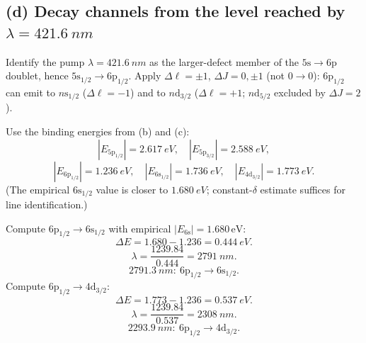\documentclass[11pt]{article}
\begin{document}
\subsection*{(d) Decay channels from the level reached by $\lambda=\SI{421.6}{nm}$}

Identify the pump $\lambda=\SI{421.6}{nm}$ as the larger-defect member of the $5\mathrm{s}\to 6\mathrm{p}$ doublet, hence $5\mathrm{s}_{1/2}\to 6\mathrm{p}_{1/2}$. Apply $\Delta\ell=\pm 1$, $\Delta J=0,\pm 1$ (not $0\to 0$): $6\mathrm{p}_{1/2}$ can emit to $n\mathrm{s}_{1/2}$ ($\Delta\ell=-1$) and to $n\mathrm{d}_{3/2}$ ($\Delta\ell=+1$; $n\mathrm{d}_{5/2}$ excluded by $\Delta J=2$).

Use the binding energies from (b) and (c):
\begin{equation}
|E_{5\mathrm{p}_{1/2}}|=\SI{2.617}{eV},\quad |E_{5\mathrm{p}_{3/2}}|=\SI{2.588}{eV},
\end{equation}
\begin{equation}
|E_{6\mathrm{p}_{1/2}}|=\SI{1.236}{eV},\quad |E_{6\mathrm{s}_{1/2}}|=\SI{1.736}{eV},\quad |E_{4\mathrm{d}_{3/2}}|=\SI{1.773}{eV}.
\end{equation}
(The empirical $6\mathrm{s}_{1/2}$ value is closer to $\SI{1.680}{eV}$; constant-$\delta$ estimate suffices for line identification.)

Compute $6\mathrm{p}_{1/2}\to 6\mathrm{s}_{1/2}$ with empirical $|E_{6\mathrm{s}}|=1.680\,\mathrm{eV}$:
\begin{equation}
\Delta E=1.680-1.236=\SI{0.444}{eV}.
\end{equation}
\begin{equation}
\lambda=\frac{1239.84}{0.444}=\SI{2791}{nm}.
\end{equation}
\begin{equation}
\boxed{\;\SI{2791.3}{nm}:\ 6\mathrm{p}_{1/2}\to 6\mathrm{s}_{1/2}.\;}
\end{equation}
Compute $6\mathrm{p}_{1/2}\to 4\mathrm{d}_{3/2}$:
\begin{equation}
\Delta E=1.773-1.236=\SI{0.537}{eV}.
\end{equation}
\begin{equation}
\lambda=\frac{1239.84}{0.537}=\SI{2308}{nm}.
\end{equation}
\begin{equation}
\boxed{\;\SI{2293.9}{nm}:\ 6\mathrm{p}_{1/2}\to 4\mathrm{d}_{3/2}.\;}
\end{equation}
\end{document}
